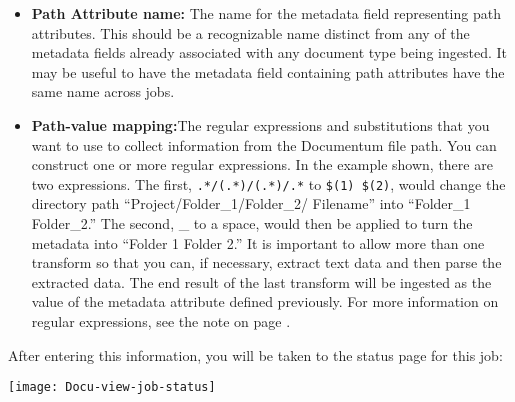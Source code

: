 \begin{itemize}

\item \textbf{Path Attribute name:} The name for the metadata field
representing path attributes. This should be a recognizable name
distinct from any of the metadata fields already associated with any
document type being ingested. It may be useful to have the metadata
field containing path attributes have the same name across jobs.

\item \textbf{Path-value mapping:}The regular expressions and
substitutions that you want to use to collect information from the
Documentum file path. You can construct one or more regular
expressions. In the example shown, there are two expressions. The
first, \verb+.*/(.*)/(.*)/.*+ to \verb+$(1) $(2)+, would change the
directory path ``Project/Folder\_1/Folder\_2/ Filename'' into
``Folder\_1 Folder\_2.'' The second, \_ to a space, would then be
applied to turn the metadata into ``Folder 1 Folder 2.'' It is
important to allow more than one transform so that you can, if
necessary, extract text data and then parse the extracted data. The
end result of the last transform will be ingested as the value of the
metadata attribute defined previously. For more information on regular
expressions, see the note on page \pageref{regex}.

\end{itemize}


After entering this information, you will be taken to the status page
for this job:

\texttt{[image: Docu-view-job-status]}

